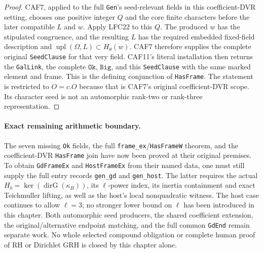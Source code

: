 \begin{proof}
CAF7, applied to the full \texttt{Gen}'s seed-relevant
fields in this coefficient-DVR setting, chooses one
positive integer \(Q\) and the core finite characters
before the later compatible \(L\) and \(w\).
Apply LFC22 to this \(Q\).  The produced \(w\) has
the stipulated congruence, and the resulting \(L\)
has the required embedded fixed-field description
and \(\operatorname{upl}(\Omega,L)\subset H_\theta(w)\).
CAF7 therefore supplies the complete original
\texttt{SeedClause} for that very field.
CAF11's literal installation then returns the
\texttt{GalLink}, the complete \(\texttt{Ok}\),
\(\texttt{Big}\), and this \texttt{SeedClause} with
the same marked element and frame.
This is the defining conjunction of \texttt{HasFrame}.
The statement is restricted to \(O=c.O\) because that
is CAF7's original coefficient-DVR scope.
Its character seed is not an automorphic rank-two
or rank-three representation.
\end{proof}

\paragraph{Exact remaining arithmetic boundary.}
The seven missing \texttt{Ok} fields, the full
\texttt{frame\_ex}/\texttt{HasFrameW} theorem, and
the coefficient-DVR \texttt{HasFrame} join have now
been proved at their original premises.
To obtain \texttt{GdFrameEx} and \texttt{HostFrameEx}
from their named data, one must still supply the full
entry records \texttt{gen\_gd} and \texttt{gen\_host}.
The latter requires the actual
\(H_b=\ker(\operatorname{dirG}(\kappa_B))\), its
\(\ell\)-power index, its inertia containment and exact
Teichmuller lifting, as well as the host's local
nonquadratic witness.  The host case continues to
allow \(\ell=3\); no stronger lower bound on \(\ell\)
has been introduced in this chapter.
Both automorphic seed producers, the shared coefficient
extension, the original/alternative endpoint matching,
and the full common \texttt{GdEnd} remain separate work.
No whole selected compound obligation or complete
human proof of RH or Dirichlet GRH is closed by this
chapter alone.

